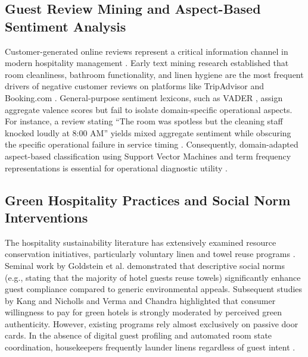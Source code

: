 \documentclass[11pt,a4paper]{article}
\begin{document}
\subsection{Guest Review Mining and Aspect-Based Sentiment Analysis}
Customer-generated online reviews represent a critical information channel in modern hospitality management \cite{xiang2015}. Early text mining research established that room cleanliness, bathroom functionality, and linen hygiene are the most frequent drivers of negative customer reviews on platforms like TripAdvisor and Booking.com \cite{berezina2015,min2015}. General-purpose sentiment lexicons, such as VADER \cite{hutto2014}, assign aggregate valence scores but fail to isolate domain-specific operational aspects. For instance, a review stating ``The room was spotless but the cleaning staff knocked loudly at 8:00 AM'' yields mixed aggregate sentiment while obscuring the specific operational failure in service timing \cite{xiang2015}. Consequently, domain-adapted aspect-based classification using Support Vector Machines and term frequency representations is essential for operational diagnostic utility \cite{joachims1998}.

\subsection{Green Hospitality Practices and Social Norm Interventions}
The hospitality sustainability literature has extensively examined resource conservation initiatives, particularly voluntary linen and towel reuse programs \cite{bohdanowicz2006,chan2013,han2018}. Seminal work by Goldstein et al. \cite{goldstein2008} demonstrated that descriptive social norms (e.g., stating that the majority of hotel guests reuse towels) significantly enhance guest compliance compared to generic environmental appeals. Subsequent studies by Kang and Nicholls \cite{kang2021} and Verma and Chandra \cite{verma2018} highlighted that consumer willingness to pay for green hotels is strongly moderated by perceived green authenticity. However, existing programs rely almost exclusively on passive door cards. In the absence of digital guest profiling and automated room state coordination, housekeepers frequently launder linens regardless of guest intent \cite{chan2013,hwang2019}.
\end{document}
